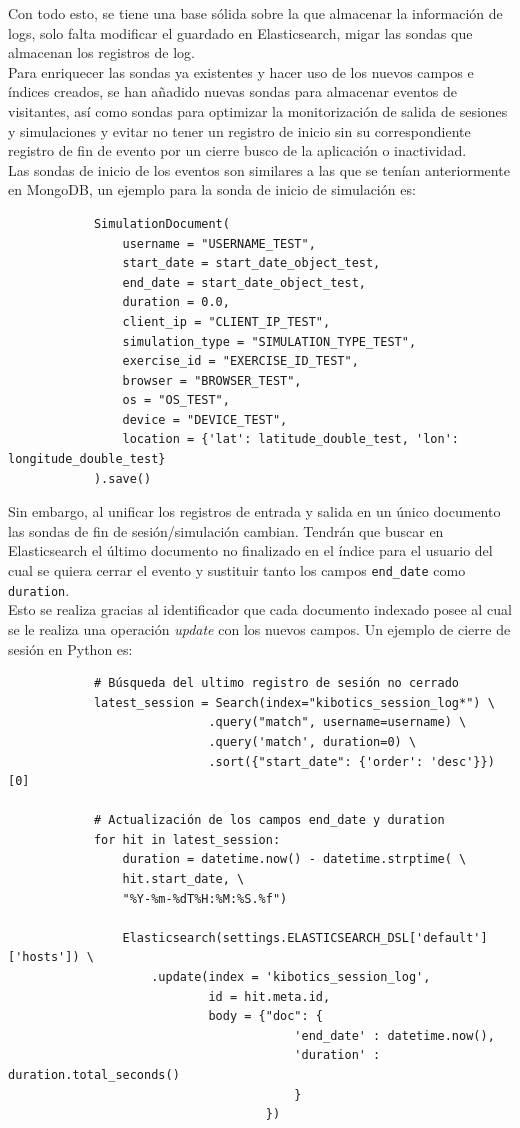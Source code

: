 \documentclass[a4paper, 12pt]{book}
\begin{document}
		Con todo esto, se tiene una base sólida sobre la que almacenar la información de logs, solo falta modificar el guardado en Elasticsearch, migar las sondas que almacenan los registros de log.\\
		
		Para enriquecer las sondas ya existentes y hacer uso de los nuevos campos e índices creados, se han añadido nuevas sondas para almacenar eventos de visitantes, así como sondas para optimizar la monitorización de salida de sesiones y simulaciones y evitar no tener un registro de inicio sin su correspondiente registro de fin de evento por un cierre busco de la aplicación o inactividad.\\
		
		Las sondas de inicio de los eventos son similares a las que se tenían anteriormente en MongoDB, un ejemplo para la sonda de inicio de simulación es:
		
		{\footnotesize
		\begin{verbatim}
			SimulationDocument(
			    username = "USERNAME_TEST",
			    start_date = start_date_object_test,
			    end_date = start_date_object_test,
			    duration = 0.0,
			    client_ip = "CLIENT_IP_TEST",
			    simulation_type = "SIMULATION_TYPE_TEST",
			    exercise_id = "EXERCISE_ID_TEST",
			    browser = "BROWSER_TEST",
			    os = "OS_TEST",
			    device = "DEVICE_TEST",
			    location = {'lat': latitude_double_test, 'lon': longitude_double_test}
			).save()
		\end{verbatim}
		}
	
		Sin embargo, al unificar los registros de entrada y salida en un único documento las sondas de fin de sesión/simulación cambian. Tendrán que buscar en Elasticsearch el último documento no finalizado en el índice para el usuario del cual se quiera cerrar el evento y sustituir tanto los campos \texttt{end\_date} como \texttt{duration}. \\
		
		Esto se realiza gracias al identificador que cada documento indexado posee al cual se le realiza una operación \textit{update} con los nuevos campos. Un ejemplo de cierre de sesión en Python es:
		
		
		{\footnotesize
		\begin{verbatim}
			# Búsqueda del ultimo registro de sesión no cerrado
			latest_session = Search(index="kibotics_session_log*") \
			                .query("match", username=username) \
			                .query('match', duration=0) \
			                .sort({"start_date": {'order': 'desc'}})[0]
			
			# Actualización de los campos end_date y duration
			for hit in latest_session:
			    duration = datetime.now() - datetime.strptime( \
			    hit.start_date, \
			    "%Y-%m-%dT%H:%M:%S.%f")
			
			    Elasticsearch(settings.ELASTICSEARCH_DSL['default']['hosts']) \
			        .update(index = 'kibotics_session_log', 
			                id = hit.meta.id,
			                body = {"doc": {
			                            'end_date' : datetime.now(), 
			                            'duration' : duration.total_seconds()
			                            }
			                        })
		\end{verbatim}
		}
	
\end{document}
